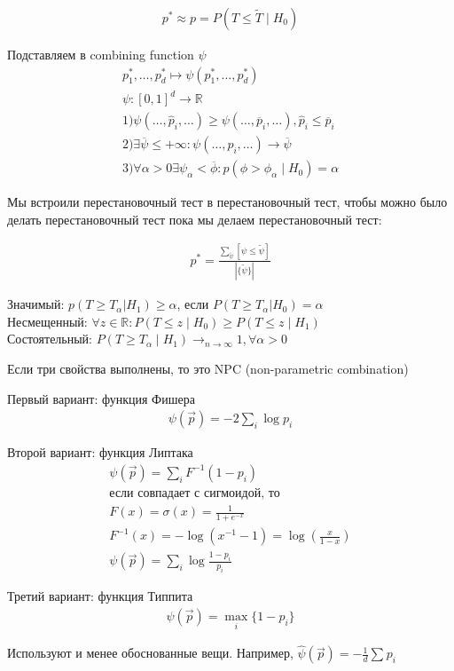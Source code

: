 \documentclass{book}
\begin{document}
\begin{gather*}
  p^*\approx p=P(T\leq \tilde{T}\mid H_0)
\end{gather*}

Подставляем в combining function $\psi$
\begin{gather*}
  p^*_1, \dots, p^*_d \mapsto \psi(p^*_1, \dots, p^*_d)\\
  \psi: [0,1]^d \rightarrow \mathbb{R}\\
  1) \psi(\dots, \hat{p}_i, \dots) \geq \psi(\dots, \overline{p}_i,\dots), \hat{p}_i \leq \overline{p}_i\\
  2) \exists \overline{\psi}\leq +\infty: \psi(\dots, p_i, \dots) \rightarrow \overline{\psi}\\
  3) \forall \alpha > 0 \exists \psi_\alpha < \overline{\phi}: p(\phi>\phi_\alpha \mid H_0)=\alpha
\end{gather*}

Мы встроили перестановочный тест в перестановочный тест, чтобы можно было делать перестановочный тест пока мы делаем перестановочный тест:

\begin{gather*}
  p^*=\frac{\sum_{\tilde{\psi}}^{} {[\psi\leq\tilde{\psi}]}}{|\{\tilde{\psi}\}|}
\end{gather*}

Значимый: $p(T\geq T_\alpha|H_1)\geq \alpha$, если $P(T\geq T_\alpha|H_0)=\alpha$\\
Несмещенный: $\forall z\in \mathbb{R}: P(T\leq z\mid H_0)\geq P(T\leq z\mid H_1)$\\
Состоятельный: $P(T\geq T_\alpha \mid H_1) \rightarrow_{n \rightarrow \infty} 1, \forall \alpha > 0$

Если три свойства выполнены, то это NPC (non-parametric combination)

Первый вариант: функция Фишера
\begin{gather*}
  \psi(\vec{p})=-2 \sum_{i}^{} {\log p_i}
\end{gather*}

Второй вариант: функция Липтака
\begin{gather*}
  \psi(\vec{p}) = \sum_{i}^{} {F^{-1}(1-p_i)}\\
  \textrm{если совпадает с сигмоидой, то}\\
  F(x)=\sigma(x)=\frac{1}{1+e^{-x}}\\
  F^{-1}(x)=-\log\left(x^{-1}-1\right)=\log\left(\frac{x}{1-x}\right)\\
  \psi(\vec{p}) = \sum_{i}^{} {\log \frac{1-p_i}{p_i}}
\end{gather*}

Третий вариант: функция Типпита
\begin{gather*}
  \psi(\vec{p}) = \max_i\{1-p_i\}
\end{gather*}

Используют и менее обоснованные вещи. Например, $\hat{\psi}(\vec{p})=-\frac{1}{d}\sum_{}^{} {p_i}$
\end{document}
